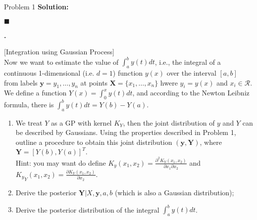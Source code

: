 \documentclass{article}
\newcounter{pcounter}                                   %
\newenvironment{problem}                                %
{                                                       %
    \color{gray}                                        %
    \stepcounter{pcounter}                              %
    \textbf{\arabic{pcounter}.}                         %
}{}                                                     %
\newenvironment{solution}                               %
{\textbf{Solution:} }{$\blacksquare$}                   %
\newcommand{\domR}{\mathcal{R}}                         %
\renewcommand{\vec}[1]{\mathbf{#1}}                     %
\begin{document}
\begin{section}{Problem 1}
\begin{solution}
\begin{enumerate}[label=\alph*)]
            \end{enumerate}
        \end{solution}

        \begin{problem}
            [Integration using Gaussian Process] \\
            Now we want to estimate the value of $\int_{a}^{b} y(t) dt$, i.e., the integral of a continuous 1-dimensional (i.e. $d=1$) function $y(x)$ over the interval $[a,b]$ from labels $\vec{y} = y_1, \dots, y_n$ at points $\vec{X} = \{x_1, \dots, x_n\}$ hwere $y_i = y(x)$ and $x_i \in \domR$. \\
            We define a function $Y(x) = \int_{0}^{x} y(t) dt$, and according to the Newton Leibniz formula, there is $\int_{a}^{b} y(t) dt = Y(b) - Y(a)$.
            \begin{enumerate}[label=\alph*)]
                \item We treat $Y$ as a GP with kernel $K_Y$, then the joint distribution of $y$ and $Y$ can be described by Gaussians. Using the properties described in Problem 1, outline a procedure to obtain this joint distribution $(\vec{y}, \vec{Y})$, where $\vec{Y} = [Y(b), Y(a)]^T$.\\
                Hint: you may want do define $K_y(x_1, x_2) = \frac{\partial^2 K_Y(x_1, x_2)}{\partial x_1 \partial x_2}$ and ${K_y}_{Y}(x_1, x_2) = \frac{\partial K_Y(x_1, x_2)}{\partial x_2}$.

                \item Derive the posterior $\vec{Y}|X, \vec{y}, a, b$ (which is also a Gaussian distribution);
                
                \item Derive the posterior distribution of the integral $\int_{a}^{b} y(t) dt$.
            \end{enumerate}
        \end{problem}


\end{section}
\end{document}
